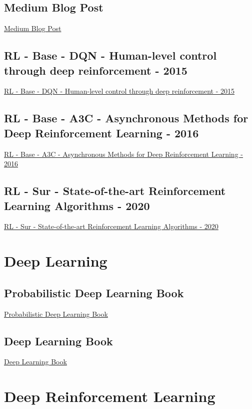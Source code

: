 \subsection{Medium Blog Post}
\href{https://medium.com/emergent-future/simple-reinforcement-learning-with-tensorflow-part-0-q-learning-with-tables-and-neural-networks-d195264329d0}{Medium Blog Post}

\subsection{RL - Base - DQN - Human-level control through deep reinforcement - 2015}
\href{https://www.nature.com/articles/nature14236}{RL - Base - DQN - Human-level control through deep reinforcement - 2015}

\subsection{RL - Base - A3C - Asynchronous Methods for Deep Reinforcement Learning - 2016}
\href{http://proceedings.mlr.press/v48/mniha16.html}{RL - Base - A3C - Asynchronous Methods for Deep Reinforcement Learning - 2016}

\subsection{RL - Sur - State-of-the-art Reinforcement Learning Algorithms - 2020}
\href{https://www.researchgate.net/publication/338396174_State-of-the-Art_Reinforcement_Learning_Algorithms}{RL - Sur - State-of-the-art Reinforcement Learning Algorithms - 2020}

\section{Deep Learning}
\subsection{Probabilistic Deep Learning Book}
\href{https://probml.github.io/pml-book/book1.html}{Probabilistic Deep Learning Book}
\\

\subsection{Deep Learning Book}
\href{https://www.deeplearningbook.org/}{Deep Learning Book}
\\

\section{Deep Reinforcement Learning}
